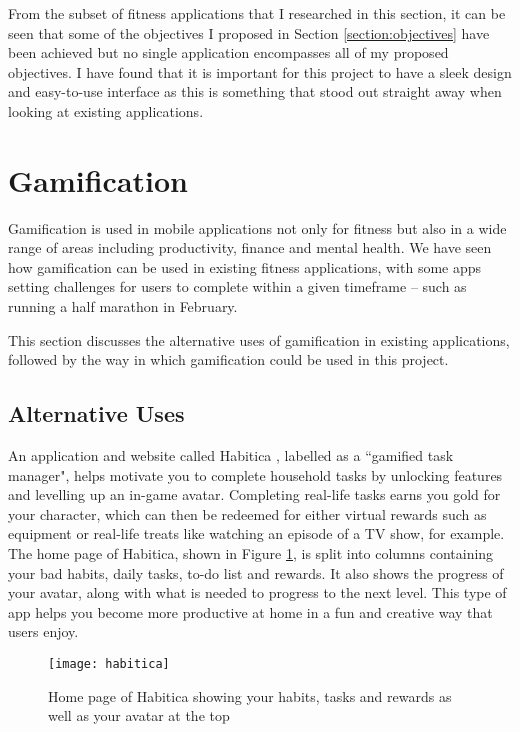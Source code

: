 From the subset of fitness applications that I researched in this section, it can be seen that some of the objectives I proposed in Section \ref{section:objectives} have been achieved but no single application encompasses all of my proposed objectives. I have found that it is important for this project to have a sleek design and easy-to-use interface as this is something that stood out straight away when looking at existing applications.


\section{Gamification}


Gamification is used in mobile applications not only for fitness but also in a wide range of areas including productivity, finance and mental health. We have seen how gamification can be used in existing fitness applications, with some apps setting challenges for users to complete within a given timeframe -- such as running a half marathon in February.

This section discusses the alternative uses of gamification in existing applications, followed by the way in which gamification could be used in this project.

\subsection{Alternative Uses}

An application and website called Habitica \cite{Habitica}, labelled as a ``gamified task manager", helps motivate you to complete household tasks by unlocking features and levelling up an in-game avatar. Completing real-life tasks earns you gold for your character, which can then be redeemed for either virtual rewards such as equipment or real-life treats like watching an episode of a TV show, for example. The home page of Habitica, shown in Figure \ref{fig:habitica}, is split into columns containing your bad habits, daily tasks, to-do list and rewards. It also shows the progress of your avatar, along with what is needed to progress to the next level. This type of app helps you become more productive at home in a fun and creative way that users enjoy.

\begin{figure}[hbt]
  \texttt{[image: habitica]}
  \caption{Home page of Habitica showing your habits, tasks and rewards as well as your avatar at the top \cite{Habiticaa}}
  \label{fig:habitica}
\end{figure}

